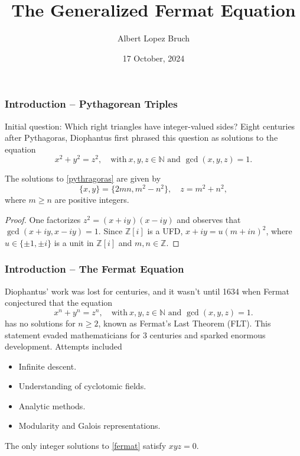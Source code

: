\documentclass{beamer}
\title{The Generalized Fermat Equation}
\author{Albert Lopez Bruch}
\date{17 October, 2024}
\newcommand{\NN}{\mathbb{N}}
\newcommand{\ZZ}{\mathbb{Z}}
\theoremstyle{plain}
\begin{document}
\frame{\titlepage}


\begin{frame}
    \frametitle{Introduction -- Pythagorean Triples}
    Initial question: Which right triangles have integer-valued sides?
    Eight centuries after Pythagoras, Diophantus first phrased this question as solutions to the equation
    \begin{equation}\label{pythragoras}
        x^2+y^2=z^2, \quad\text{with}\ x,y,z\in\NN \text{ and }\gcd(x,y,z)=1.
    \end{equation}

    \begin{theorem}[Diophantus, 3rd C.]
        The solutions to \eqref{pythragoras} are given by
        \[\{x,y\}=\{2mn,m^2-n^2\},\quad z=m^2+n^2,\]
        where $m\geq n$ are positive integers.
    \end{theorem}
    \begin{proof}
        One factorizes $z^2=(x+iy)(x-iy)$ and observes that $\gcd(x+iy,x-iy)=1$. Since $\ZZ[i]$ is a UFD, $x+iy=u(m+in)^2$, where $u\in\{\pm1,\pm i\}$ is a unit in $\ZZ[i]$ and $m,n\in\ZZ$.
    \end{proof}
\end{frame}

\begin{frame}
    \frametitle{Introduction -- The Fermat Equation}
    Diophantus' work was lost for centuries, and it wasn't until 1634 when Fermat conjectured that the equation
    \begin{equation}\label{fermat}
        x^n+y^n=z^n, \quad\text{with}\ x,y,z\in\NN \text{ and }\gcd(x,y,z)=1.
    \end{equation}
    has no solutions for $n\geq 2$, known as Fermat's Last Theorem (FLT). This statement evaded mathematicians for 3 centuries and sparked enormous development. Attempts included
    \begin{itemize}
        \item Infinite descent.
        \item Understanding of cyclotomic fields.
        \item Analytic methods.
        \item Modularity and Galois representations.
    \end{itemize}    
    \begin{theorem}[Wiles, 1994]
        The only integer solutions to \eqref{fermat} satisfy $xyz=0$. 
    \end{theorem}
\end{frame}
\end{document}
